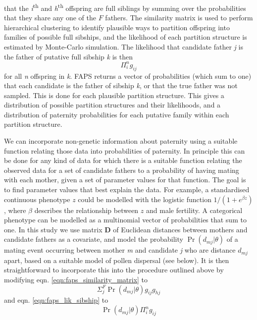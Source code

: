 \documentclass[10pt, a4paper, twocolumn]{article} %
\begin{document}
that the \textit{i}\textsuperscript{th} and \textit{h}\textsuperscript{th} offspring are full siblings by summing over the probabilities that they share any one of the $F$ fathers. The similarity matrix is used to perform hierarchical clustering to identify plausible ways to partition offspring into families of possible full sibships, and the likelihood of each partition structure is estimated by Monte-Carlo simulation. The likelihood that candidate father \textit{j} is the father of putative full sibship \textit{k} is then
\begin{equation}\label{eqn:faps_lik_sibship}
\Pi_i^n g_{ij}
\end{equation}
for all \textit{n} offspring in \textit{k}. FAPS returns a vector of probabilities (which sum to one) that each candidate is the father of sibship \textit{k}, or that the true father was not sampled. This is done for each plausible partition structure. This gives a distribution of possible partition structures and their likelihoods, and a distribution of paternity probabilities for each putative family within each partition structure.

We can incorporate non-genetic information about paternity using a suitable function relating those data into probabilities of paternity.
In principle this can be done for any kind of data for which there is a suitable function relating the observed data for a set of candidate fathers to a probability of having mating with each mother, given a set of parameter values for that function. The goal is to find parameter values that best explain the data. For example, a standardised continuous phenotype $z$ could be modelled with the logistic function $1/(1+e^{\beta z})$, where $\beta$ describes the relationship between $z$ and male fertility.
A categorical phenotype can be modelled as a multinomial vector of probabilities that sum to one.
In this study we use matrix \textbf{D} of Euclidean distances between mothers and candidate fathers as a covariate, and model the probability $\Pr(d_{mj}|\theta)$ of a mating event occurring between mother \textit{m} and candidate \textit{j} who are distance $d_{mj}$ apart, based on a suitable model of pollen dispersal (see below).
It is then straightforward to incorporate this into the procedure outlined above by modifying eqn. \ref{eqn:faps_similarity_matrix} to
\begin{equation}\label{eqn:pairwise_with_covariates}
\Sigma_j^F \Pr(d_{mj} | \theta)g_{ij}g_{hj}
\end{equation}
and eqn. \ref{eqn:faps_lik_sibship} to
\begin{equation}
\label{sibship_with_covariates}
\Pr(d_{mj} | \theta)\Pi_i^n g_{ij}
\end{equation}
\end{document}
